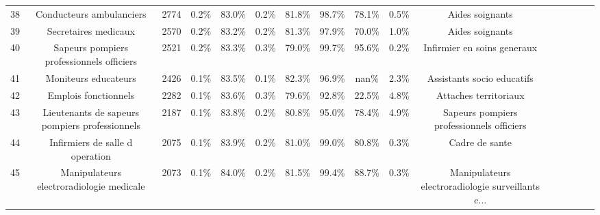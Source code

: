 \documentclass[10pt]{article}
\begin{document}
\begin{landscape}
\begin{longtable}{ | p{0.5cm} |*{15}{c|} }
38  &                           Conducteurs ambulanciers &           2774 &           0.2\% &                  83.0\% &                 0.2\% &                    81.8\% &              98.7\% &                             78.1\% &                                     0.5\% &                                    Aides soignants \\
39  &                               Secretaires medicaux &           2570 &           0.2\% &                  83.2\% &                 0.2\% &                    81.3\% &              97.9\% &                             70.0\% &                                     1.0\% &                                    Aides soignants \\
40  &          Sapeurs pompiers professionnels officiers &           2521 &           0.2\% &                  83.3\% &                 0.3\% &                    79.0\% &              99.7\% &                             95.6\% &                                     0.2\% &                        Infirmier en soins generaux \\
41  &                               Moniteurs educateurs &           2426 &           0.1\% &                  83.5\% &                 0.1\% &                    82.3\% &              96.9\% &                              nan\% &                                     2.3\% &                         Assistants socio educatifs \\
42  &                               Emplois fonctionnels &           2282 &           0.1\% &                  83.6\% &                 0.3\% &                    79.6\% &              92.8\% &                             22.5\% &                                     4.8\% &                              Attaches territoriaux \\
43  &     Lieutenants de sapeurs pompiers professionnels &           2187 &           0.1\% &                  83.8\% &                 0.2\% &                    80.8\% &              95.0\% &                             78.4\% &                                     4.9\% &          Sapeurs pompiers professionnels officiers \\
44  &                    Infirmiers de salle d operation &           2075 &           0.1\% &                  83.9\% &                 0.2\% &                    81.0\% &              99.0\% &                             80.8\% &                                     0.3\% &                                     Cadre de sante \\
45  &           Manipulateurs electroradiologie medicale &           2073 &           0.1\% &                  84.0\% &                 0.2\% &                    81.5\% &              99.4\% &                             88.7\% &                                     0.3\% &  Manipulateurs electroradiologie surveillants c... \\

\end{longtable}
\end{landscape}
\end{document}
